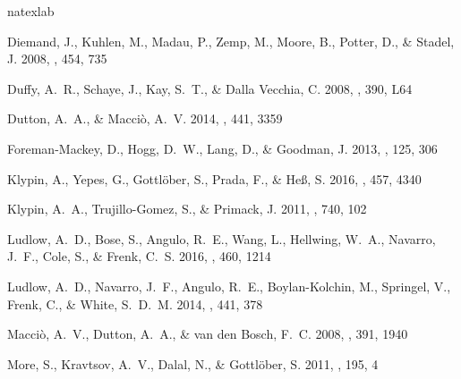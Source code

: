 \documentclass{emulateapj}
\begin{document}
\begin{thebibliography}{18}
\expandafter\ifx\csname natexlab\endcsname\relax\def\natexlab#1{#1}\fi

{Diemand}, J., {Kuhlen}, M., {Madau}, P., {Zemp}, M., {Moore}, B., {Potter},
  D., \& {Stadel}, J. 2008, \nat, 454, 735

{Duffy}, A.~R., {Schaye}, J., {Kay}, S.~T., \& {Dalla Vecchia}, C. 2008,
  \mnras, 390, L64

{Dutton}, A.~A., \& {Macci{\`o}}, A.~V. 2014, \mnras, 441, 3359

{Foreman-Mackey}, D., {Hogg}, D.~W., {Lang}, D., \& {Goodman}, J. 2013, \pasp,
  125, 306

{Klypin}, A., {Yepes}, G., {Gottl{\"o}ber}, S., {Prada}, F., \& {He{\ss}}, S.
  2016, \mnras, 457, 4340

{Klypin}, A.~A., {Trujillo-Gomez}, S., \& {Primack}, J. 2011, \apj, 740, 102

{Ludlow}, A.~D., {Bose}, S., {Angulo}, R.~E., {Wang}, L., {Hellwing}, W.~A.,
  {Navarro}, J.~F., {Cole}, S., \& {Frenk}, C.~S. 2016, \mnras, 460, 1214

{Ludlow}, A.~D., {Navarro}, J.~F., {Angulo}, R.~E., {Boylan-Kolchin}, M.,
  {Springel}, V., {Frenk}, C., \& {White}, S.~D.~M. 2014, \mnras, 441, 378

{Macci{\`o}}, A.~V., {Dutton}, A.~A., \& {van den Bosch}, F.~C. 2008, \mnras,
  391, 1940

{More}, S., {Kravtsov}, A.~V., {Dalal}, N., \& {Gottl{\"o}ber}, S. 2011, \apjs,
  195, 4


\end{thebibliography}
\end{document}
